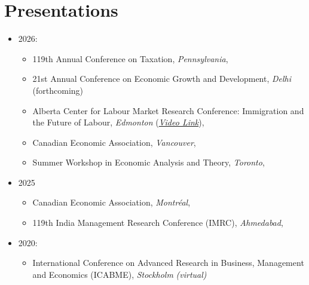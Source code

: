 \documentclass[11pt]{article}
\newenvironment{cvlist}
  {\begin{itemize}[leftmargin=1.2em,itemsep=4pt,topsep=2pt,parsep=0pt]}
  {\end{itemize}}
\begin{document}
\section{Presentations}
\begin{cvlist}
    \item 2026: 
    \begin{itemize}
    \item 119th Annual Conference on Taxation, \textit{Pennsylvania},
    \item 21st Annual Conference on Economic Growth and Development, \textit{Delhi} (forthcoming)
    \item Alberta Center for Labour Market Research Conference: Immigration and the Future of Labour, \textit{Edmonton} (\href{https://vimeo.com/1229764145?fl=pl&fe=sh#t=1h21m50s}{\textit{Video Link}}),
    \item Canadian Economic Association, \textit{Vancouver}, 
    \item Summer Workshop in Economic Analysis and Theory, \textit{Toronto},
    \end{itemize}
    \item 2025
    \begin{itemize}
    \item Canadian Economic Association, \textit{Montréal}, 
    \item 119th India Management Research Conference (IMRC), \textit{Ahmedabad}, 
    \end{itemize}
    \item 2020: 
    \begin{itemize}
        \item International Conference on Advanced Research in Business, Management and Economics (ICABME), \textit{Stockholm} \textit{(virtual)}
    \end{itemize}
    
\end{cvlist}
\end{document}

